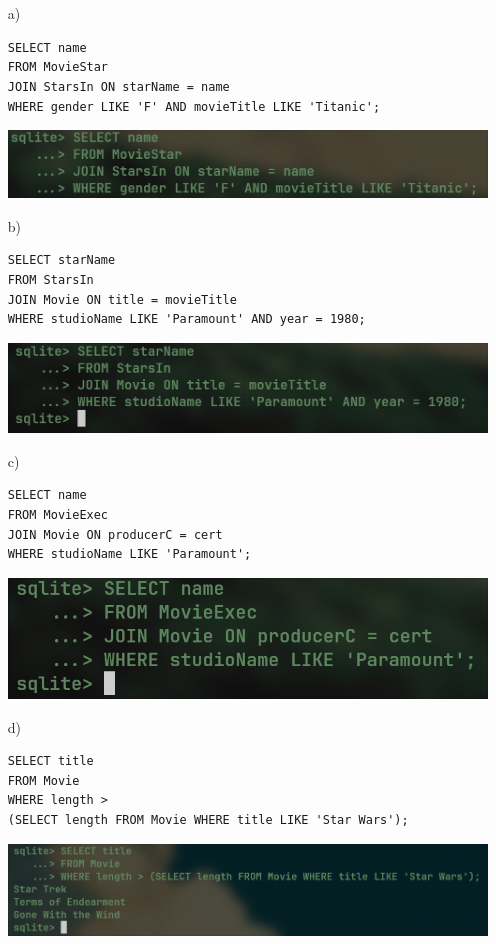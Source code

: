 \documentclass{article}
\begin{document}
	\section{}
	\begin{itemize}
		\item[a)] 
			\begin{verbatim}
SELECT name
FROM MovieStar
JOIN StarsIn ON starName = name
WHERE gender LIKE 'F' AND movieTitle LIKE 'Titanic';
			\end{verbatim}
			\begin{center}
				\includegraphics[scale=0.300]{titanic.png}
			\end{center}
		\item[b)] 
			\begin{verbatim}
SELECT starName
FROM StarsIn
JOIN Movie ON title = movieTitle
WHERE studioName LIKE 'Paramount' AND year = 1980;
			\end{verbatim}
			\begin{center}
				\includegraphics[scale=0.325]{1980.png}
			\end{center}
		\item[c)] 
			\begin{verbatim}
SELECT name
FROM MovieExec
JOIN Movie ON producerC = cert
WHERE studioName LIKE 'Paramount';
			\end{verbatim}
			\begin{center}
				\includegraphics[scale=0.375]{parapro.png}
			\end{center}
		\item[d)] 
			\begin{verbatim}
SELECT title
FROM Movie
WHERE length >
(SELECT length FROM Movie WHERE title LIKE 'Star Wars');
			\end{verbatim}
			\begin{center}
				\includegraphics[scale=0.250]{starwars.png}
			\end{center}
	\end{itemize}
\end{document}
